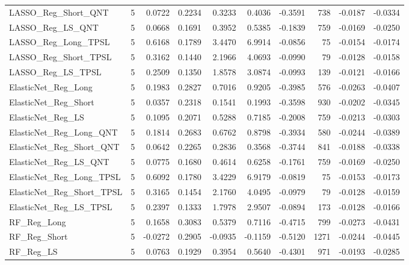 \begin{tabular}{llrrrrrrrr}
\cline{1-10}
LASSO\_Reg\_Short\_QNT & 5 & 0.0722 & 0.2234 & 0.3233 & 0.4036 & -0.3591 & 738 & -0.0187 & -0.0334 \\
\cline{1-10}
LASSO\_Reg\_LS\_QNT & 5 & 0.0668 & 0.1691 & 0.3952 & 0.5385 & -0.1839 & 759 & -0.0169 & -0.0250 \\
\cline{1-10}
LASSO\_Reg\_Long\_TPSL & 5 & 0.6168 & 0.1789 & 3.4470 & 6.9914 & -0.0856 & 75 & -0.0154 & -0.0174 \\
\cline{1-10}
LASSO\_Reg\_Short\_TPSL & 5 & 0.3162 & 0.1440 & 2.1966 & 4.0693 & -0.0990 & 79 & -0.0128 & -0.0158 \\
\cline{1-10}
LASSO\_Reg\_LS\_TPSL & 5 & 0.2509 & 0.1350 & 1.8578 & 3.0874 & -0.0993 & 139 & -0.0121 & -0.0166 \\
\cline{1-10}
ElasticNet\_Reg\_Long & 5 & 0.1983 & 0.2827 & 0.7016 & 0.9205 & -0.3985 & 576 & -0.0263 & -0.0407 \\
\cline{1-10}
ElasticNet\_Reg\_Short & 5 & 0.0357 & 0.2318 & 0.1541 & 0.1993 & -0.3598 & 930 & -0.0202 & -0.0345 \\
\cline{1-10}
ElasticNet\_Reg\_LS & 5 & 0.1095 & 0.2071 & 0.5288 & 0.7185 & -0.2008 & 759 & -0.0213 & -0.0303 \\
\cline{1-10}
ElasticNet\_Reg\_Long\_QNT & 5 & 0.1814 & 0.2683 & 0.6762 & 0.8798 & -0.3934 & 580 & -0.0244 & -0.0389 \\
\cline{1-10}
ElasticNet\_Reg\_Short\_QNT & 5 & 0.0642 & 0.2265 & 0.2836 & 0.3568 & -0.3744 & 841 & -0.0188 & -0.0338 \\
\cline{1-10}
ElasticNet\_Reg\_LS\_QNT & 5 & 0.0775 & 0.1680 & 0.4614 & 0.6258 & -0.1761 & 759 & -0.0169 & -0.0250 \\
\cline{1-10}
ElasticNet\_Reg\_Long\_TPSL & 5 & 0.6092 & 0.1780 & 3.4229 & 6.9179 & -0.0819 & 75 & -0.0153 & -0.0173 \\
\cline{1-10}
ElasticNet\_Reg\_Short\_TPSL & 5 & 0.3165 & 0.1454 & 2.1760 & 4.0495 & -0.0979 & 79 & -0.0128 & -0.0159 \\
\cline{1-10}
ElasticNet\_Reg\_LS\_TPSL & 5 & 0.2397 & 0.1333 & 1.7978 & 2.9507 & -0.0894 & 173 & -0.0128 & -0.0166 \\
\cline{1-10}
RF\_Reg\_Long & 5 & 0.1658 & 0.3083 & 0.5379 & 0.7116 & -0.4715 & 799 & -0.0273 & -0.0431 \\
\cline{1-10}
RF\_Reg\_Short & 5 & -0.0272 & 0.2905 & -0.0935 & -0.1159 & -0.5120 & 1271 & -0.0244 & -0.0445 \\
\cline{1-10}
RF\_Reg\_LS & 5 & 0.0763 & 0.1929 & 0.3954 & 0.5640 & -0.4301 & 971 & -0.0193 & -0.0285 \\

\end{tabular}
